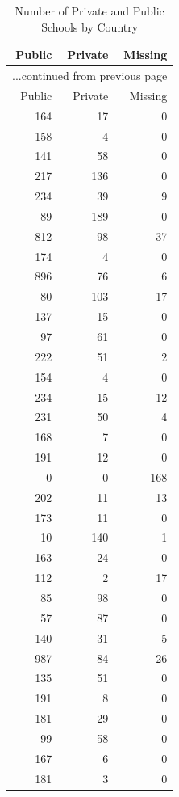 \documentclass[letterpaper,11pt]{article}
\begin{document}
\begin{longtable}{rrr}
\caption{Number of Private and Public Schools by Country} \\ 
  \hline
  Public & Private & Missing \\ \endfirsthead \multicolumn{3}{l}{{...continued from previous page}}\\ \hline Public & Private & Missing  \\ \hline \endhead \hline
164 &  17 &   0 \\ 
  158 &   4 &   0 \\ 
  141 &  58 &   0 \\ 
  217 & 136 &   0 \\ 
  234 &  39 &   9 \\ 
   89 & 189 &   0 \\ 
  812 &  98 &  37 \\ 
  174 &   4 &   0 \\ 
  896 &  76 &   6 \\ 
   80 & 103 &  17 \\ 
  137 &  15 &   0 \\ 
   97 &  61 &   0 \\ 
  222 &  51 &   2 \\ 
  154 &   4 &   0 \\ 
  234 &  15 &  12 \\ 
  231 &  50 &   4 \\ 
  168 &   7 &   0 \\ 
  191 &  12 &   0 \\ 
    0 &   0 & 168 \\ 
  202 &  11 &  13 \\ 
  173 &  11 &   0 \\ 
   10 & 140 &   1 \\ 
  163 &  24 &   0 \\ 
  112 &   2 &  17 \\ 
   85 &  98 &   0 \\ 
   57 &  87 &   0 \\ 
  140 &  31 &   5 \\ 
  987 &  84 &  26 \\ 
  135 &  51 &   0 \\ 
  191 &   8 &   0 \\ 
  181 &  29 &   0 \\ 
   99 &  58 &   0 \\ 
  167 &   6 &   0 \\ 
  181 &   3 &   0 \\ 

\end{longtable}
\end{document}
